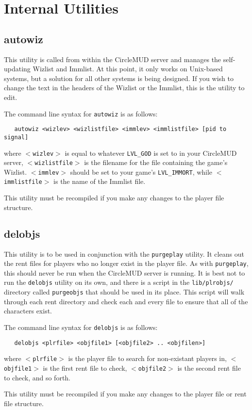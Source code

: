 \documentclass[11pt]{article}
\begin{document}
\section{Internal Utilities}
\subsection{autowiz}
This utility is called from within the CircleMUD server and manages the self-updating Wizlist and Immlist.  At this point, it only works on Unix-based systems, but a solution for all other systems is being designed.  If you wish to change the text in the headers of the Wizlist or the Immlist, this is the utility to edit.
\par
The command line syntax for \texttt{autowiz} is as follows:
\begin{verbatim}
   autowiz <wizlev> <wizlistfile> <immlev> <immlistfile> [pid to signal]
\end{verbatim}
where \texttt{$<$wizlev$>$} is equal to whatever \texttt{LVL\_GOD} is set to in your CircleMUD server, \texttt{$<$wizlistfile$>$} is the filename for the file containing the game's Wizlist.  \texttt{$<$immlev$>$} should be set to your game's \texttt{LVL\_IMMORT}, while \texttt{$<$immlistfile$>$} is the name of the Immlist file.
\par
This utility must be recompiled if you make any changes to the player file structure.

\subsection{delobjs}
This utility is to be used in conjunction with the \texttt{purgeplay} utility.  It cleans out the rent files for players who no longer exist in the player file.  As with \texttt{purgeplay}, this should never be run when the CircleMUD server is running.  It is best not to run the \texttt{delobjs} utility on its own, and there is a script in the \texttt{lib/plrobjs/} directory called \texttt{purgeobjs} that should be used in its place.  This script will walk through each rent directory and check each and every file to ensure that all of the characters exist.
\par
The command line syntax for \texttt{delobjs} is as follows:
\begin{verbatim}
   delobjs <plrfile> <objfile1> [<objfile2> .. <objfilen>]
\end{verbatim}
where \texttt{$<$plrfile$>$} is the player file to search for non-existant players in, \texttt{$<$objfile1$>$} is the first rent file to check, \texttt{$<$objfile2$>$} is the second rent file to check, and so forth.
\par
This utility must be recompiled if you make any changes to the player file or rent file structure.
\end{document}
